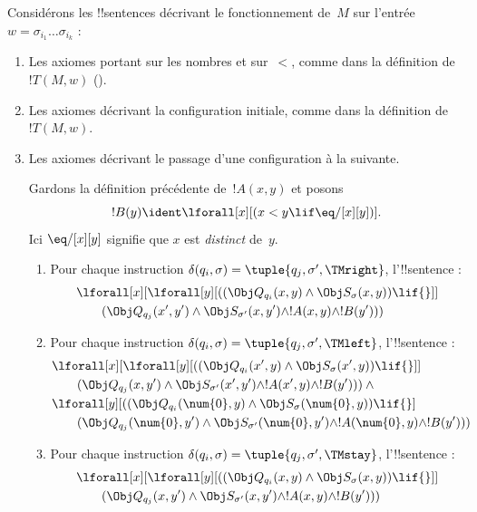 \documentclass[../../../include/open-logic-section]{subfiles}
\begin{document}
Considérons les !!{sentence}s décrivant le fonctionnement de~$M$
sur l'entrée $w=\sigma_{i_1}\dots\sigma_{i_k}$ :
\begin{enumerate}
\item Les axiomes portant sur les nombres et sur~$<$, comme dans
  la définition de~$!T(M,w)$ ().
\item Les axiomes décrivant la configuration initiale, comme
  dans la définition de~$!T(M,w)$.
\item Les axiomes décrivant le passage d'une configuration à la
  suivante.

Gardons la définition précédente de~$!A(x,y)$ et posons
\[
!B(y)\ident\lforall[x][(x<y\lif\eq/[x][y])].
\]
Ici $\eq/[x][y]$ signifie que $x$ est \emph{distinct} de~$y$.
\begin{enumerate}
\item {} Pour chaque instruction
  $\delta(q_i,\sigma)=\tuple{q_j,\sigma',\TMright}$,
  l'!!{sentence} :
\begin{align*}
& \lforall[x][\lforall[y][(
  (\Obj Q_{q_i}(x,y)\land\Obj S_\sigma(x,y))\lif {}]]\\
&\qquad (\Obj Q_{q_j}(x',y')\land
  \Obj S_{\sigma'}(x,y')\land !A(x,y)\land !B(y')))
\end{align*}
\item {} Pour chaque instruction
  $\delta(q_i,\sigma)=\tuple{q_j,\sigma',\TMleft}$,
  l'!!{sentence} :
\begin{align*}
& \lforall[x][\lforall[y][(
  (\Obj Q_{q_i}(x',y)\land\Obj S_\sigma(x',y))\lif {}]]\\
&\qquad (\Obj Q_{q_j}(x,y')\land
  \Obj S_{\sigma'}(x',y')\land
  !A(x',y)\land !B(y')))\land {}\\
& \lforall[y][(
  (\Obj Q_{q_i}(\num{0},y)\land
  \Obj S_\sigma(\num{0},y))\lif {}]\\
&\qquad (\Obj Q_{q_j}(\num{0},y')\land
  \Obj S_{\sigma'}(\num{0},y')\land
  !A(\num{0},y)\land !B(y')))
\end{align*}
\item {} Pour chaque instruction
  $\delta(q_i,\sigma)=\tuple{q_j,\sigma',\TMstay}$,
  l'!!{sentence} :
\begin{align*}
& \lforall[x][\lforall[y][(
  (\Obj Q_{q_i}(x,y)\land\Obj S_\sigma(x,y))\lif {}]]\\
&\qquad (\Obj Q_{q_j}(x,y')\land
  \Obj S_{\sigma'}(x,y')\land !A(x,y)\land !B(y')))
\end{align*}
\end{enumerate}

\end{enumerate}
\end{document}
